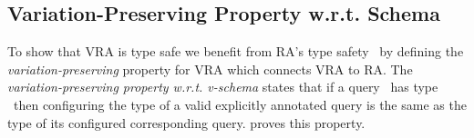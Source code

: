 \subsection{Variation-Preserving Property w.r.t. Schema}
\label{sec:var-pres}

To show that VRA is type safe we benefit from RA's type safety~\cite{RAtypeSys}
by defining the \emph{variation-preserving} property for VRA which connects VRA to RA.
%
The 
\emph{variation-preserving property w.r.t. v-schema} states that
if a query \vQ\ has type \vType\ then 
configuring the type of a valid explicitly annotated query
is the same as the type of its configured
corresponding query. 
%
 proves this property.

